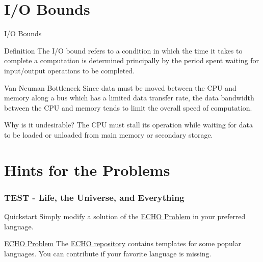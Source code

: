 \documentclass{beamer}
\begin{document}


\section{I/O Bounds}

\begin{frame}{I/O Bounds}

  \begin{block}{Definition}
    The I/O bound refers to a condition in which the time it takes to complete a computation is determined principally by the period spent waiting for input/output operations to be completed.
  \end{block}

  \begin{block}{Van Neuman Bottleneck}
    Since data must be moved between the CPU and memory along a bus which has a limited data transfer rate, the data bandwidth between the CPU and memory tends to limit the overall speed of computation.
  \end{block}

  \begin{block}{Why is it undesirable?}
    The CPU must stall its operation while waiting for data to be loaded or unloaded from main memory or secondary storage.
  \end{block}

\end{frame}


\section{Hints for the Problems}

\begin{frame}
  \frametitle{TEST - Life, the Universe, and Everything}

  \begin{alertblock}{Quickstart}
    Simply modify a solution of the \href{https://github.com/arnaud-m/echo}{ECHO Problem} in your preferred language.
  \end{alertblock}

  \begin{block}{\href{https://github.com/arnaud-m/echo}{ECHO Problem}}
    The \href{https://github.com/arnaud-m/echo}{ECHO repository} contains templates for some popular languages. You can contribute if your favorite language is missing.
  \end{block}
\end{frame}
\end{document}
